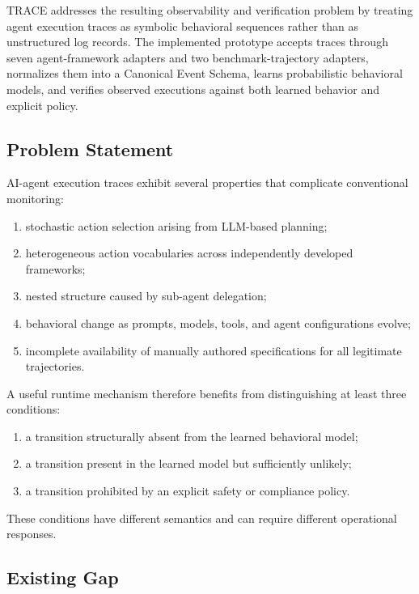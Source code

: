 \documentclass[11pt,a4paper]{article}
\begin{document}
TRACE addresses the resulting observability and verification problem by treating agent
execution traces as symbolic behavioral sequences rather than as unstructured log
records. The implemented prototype accepts traces through seven agent-framework
adapters and two benchmark-trajectory adapters, normalizes them into a Canonical Event
Schema, learns probabilistic behavioral models, and verifies observed executions against
both learned behavior and explicit policy.

\subsection{Problem Statement}

AI-agent execution traces exhibit several properties that complicate conventional
monitoring:

\begin{enumerate}[label=(\alph*)]
\item stochastic action selection arising from LLM-based planning;
\item heterogeneous action vocabularies across independently developed frameworks;
\item nested structure caused by sub-agent delegation;
\item behavioral change as prompts, models, tools, and agent configurations evolve;
\item incomplete availability of manually authored specifications for all legitimate
trajectories.
\end{enumerate}

A useful runtime mechanism therefore benefits from distinguishing at least three
conditions:

\begin{enumerate}
\item a transition structurally absent from the learned behavioral model;
\item a transition present in the learned model but sufficiently unlikely;
\item a transition prohibited by an explicit safety or compliance policy.
\end{enumerate}

These conditions have different semantics and can require different operational responses.

\subsection{Existing Gap}
\end{document}
